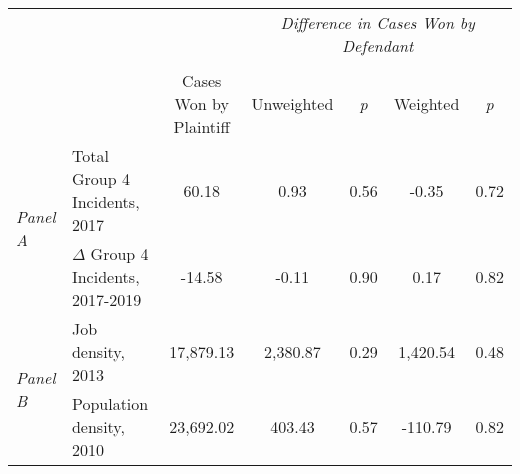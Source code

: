 \begin{tabular}{llccccc}
\toprule
 &  & \textit{} & \multicolumn{4}{c}{\textit{Difference in Cases Won by Defendant}} \\
\cline{4-7}
\\
 &  & Cases Won by Plaintiff & Unweighted & \emph{p} & Weighted & \emph{p} \\
\midrule
\multirow[c]{2}{.75cm}{\textit{Panel A}} & Total Group 4 Incidents, 2017 & 60.18 & 0.93 & 0.56 & -0.35 & 0.72 \\
 & $\Delta$ Group 4 Incidents, 2017-2019 & -14.58 & -0.11 & 0.90 & 0.17 & 0.82 \\
\cline{1-7}
\multirow[c]{2}{.75cm}{\textit{Panel B}} & Job density, 2013 & 17,879.13 & 2,380.87 & 0.29 & 1,420.54 & 0.48 \\
 & Population density, 2010 & 23,692.02 & 403.43 & 0.57 & -110.79 & 0.82 \\
\cline{1-7}
\bottomrule
\end{tabular}
